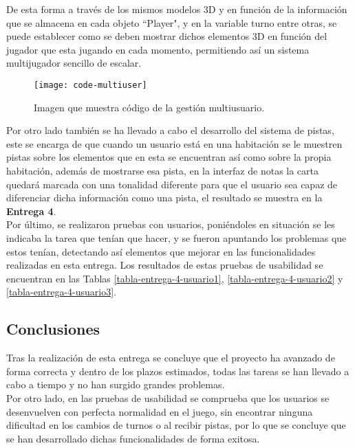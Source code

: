 De esta forma a través de los mismos modelos 3D y en función de la información que se almacena en cada objeto ``Player", y en la variable turno entre otras, se puede establecer como se deben mostrar dichos elementos 3D en función del jugador que esta jugando en cada momento, permitiendo así un sistema multijugador sencillo de escalar.

\begin{figure}[h]
  \centering
  \texttt{[image: code-multiuser]}
  \caption{Imagen que muestra código de la gestión multiusuario.}
  \label{figura-code-multiuser}
\end{figure}

Por otro lado también se ha llevado a cabo el desarrollo del sistema de pistas, este se encarga de que cuando un usuario está en una habitación se le muestren pistas sobre los elementos que en esta se encuentran así como sobre la propia habitación, además de mostrarse esa pista, en la interfaz de notas la carta quedará marcada con una tonalidad diferente para que el usuario sea capaz de diferenciar dicha información como una pista, el resultado se muestra en la \textbf{Entrega 4}.\\

Por último, se realizaron pruebas con usuarios, poniéndoles en situación se les indicaba la tarea que tenían que hacer, y se fueron apuntando los problemas que estos tenían, detectando así elementos que mejorar en las funcionalidades realizadas en esta entrega. Los resultados de estas pruebas de usabilidad se encuentran en las Tablas \ref{tabla-entrega-4-usuario1}, \ref{tabla-entrega-4-usuario2} y \ref{tabla-entrega-4-usuario3}.


\subsection{Conclusiones}
Tras la realización de esta entrega se concluye que el proyecto ha avanzado de forma correcta y dentro de los plazos estimados, todas las tareas se han llevado a cabo a tiempo y no han surgido grandes problemas.\\

Por otro lado, en las pruebas de usabilidad se comprueba que los usuarios se desenvuelven con perfecta normalidad en el juego, sin encontrar ninguna dificultad en los cambios de turnos o al recibir pistas, por lo que se concluye que se han desarrollado dichas funcionalidades de forma exitosa.
